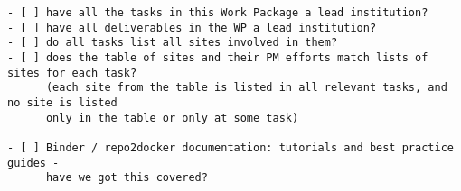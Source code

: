 \begin{draft}
\begin{verbatim}
- [ ] have all the tasks in this Work Package a lead institution?
- [ ] have all deliverables in the WP a lead institution?
- [ ] do all tasks list all sites involved in them?
- [ ] does the table of sites and their PM efforts match lists of sites for each task?
      (each site from the table is listed in all relevant tasks, and no site is listed
      only in the table or only at some task)

- [ ] Binder / repo2docker documentation: tutorials and best practice guides -
      have we got this covered?
\end{verbatim}
\end{draft}
